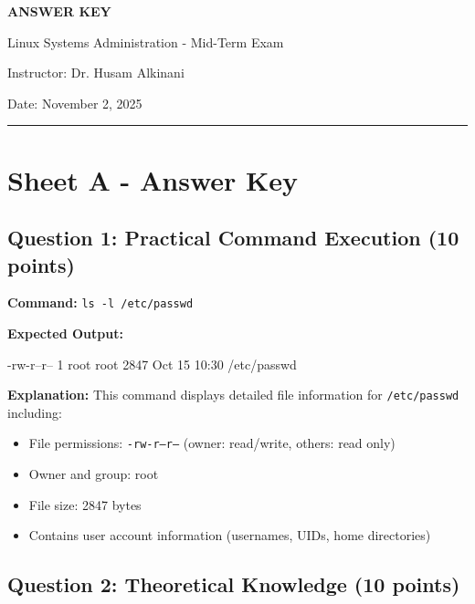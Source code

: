 \documentclass[a4paper,11pt]{article}
\begin{document}
\begin{center}
{\LARGE\textbf{\textcolor{primaryblue}{ANSWER KEY}}}

\vspace{3mm}
{\large Linux Systems Administration - Mid-Term Exam}

\vspace{2mm}
{\normalsize Instructor: Dr. Husam Alkinani}

\vspace{1mm}
{\normalsize Date: November 2, 2025}

\vspace{3mm}
\rule{\textwidth}{1pt}
\end{center}

\vspace{5mm}

\section*{Sheet A - Answer Key}

\subsection*{Question 1: Practical Command Execution (10 points)}

\textbf{Command:} \texttt{ls -l /etc/passwd}

\textbf{Expected Output:}
\begin{tcolorbox}[colback=lightgray,colframe=primaryblue,boxrule=0.5pt]
\ttfamily\small
-rw-r--r-- 1 root root 2847 Oct 15 10:30 /etc/passwd
\end{tcolorbox}

\textbf{Explanation:} This command displays detailed file information for \texttt{/etc/passwd} including:
\begin{itemize}[leftmargin=*,itemsep=2pt]
    \item File permissions: \texttt{-rw-r--r--} (owner: read/write, others: read only)
    \item Owner and group: root
    \item File size: 2847 bytes
    \item Contains user account information (usernames, UIDs, home directories)
\end{itemize}

\subsection*{Question 2: Theoretical Knowledge (10 points)}
\end{document}
